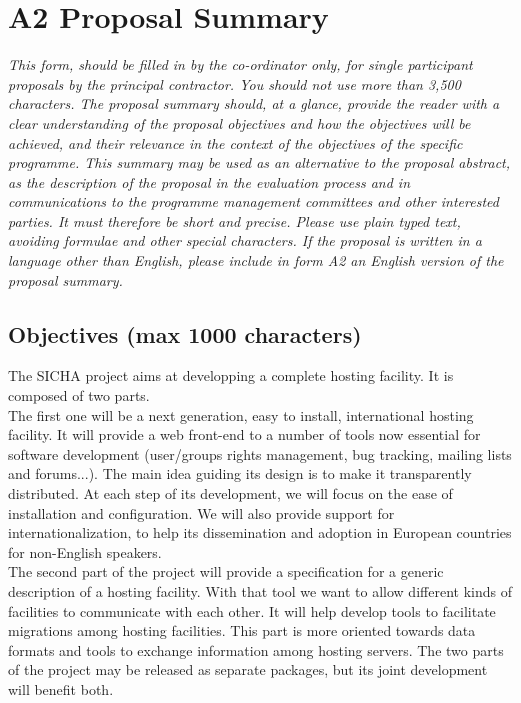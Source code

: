 \documentclass[a4paper,11pt]{report}
\begin{document}
\section*{A2 Proposal Summary}
\textit{This form, should be filled in by the co-ordinator only, for single
participant proposals by the principal contractor. You should not use more than
3,500 characters. The proposal summary should, at a glance, provide the reader
with a clear understanding of the proposal objectives and how the objectives
will be achieved, and their relevance in the context of the objectives of the
specific programme. This summary may be used as an alternative to the proposal
abstract, as the description of the proposal in the evaluation process and in
communications to the programme management committees and other interested
parties. It must therefore be short and precise. Please use plain typed text,
avoiding formulae and other special characters. If the proposal is written in a
language other than English, please include in form A2 an English version of
the proposal summary.} \\
\subsection*{Objectives (max 1000 characters)}
The SICHA project aims at developping a complete hosting facility. It is 
composed of two parts. \\
The first one will be a next generation, easy to install, international
hosting facility. It will provide a web front-end to a number of tools now 
essential for software development (user/groups rights management, bug
tracking, mailing lists and forums...). 
The main idea guiding its design is to make it transparently distributed.
At each step of its development, we will focus on the ease of installation and
configuration. We will also provide support for internationalization, to help
its dissemination and adoption in European countries for non-English speakers.
\\
The second part of the project will provide a specification for a generic
description of a hosting facility. With that tool we want to allow different
kinds of facilities to communicate with each other. It will help develop tools
to facilitate migrations among hosting facilities. This part is more oriented
towards data formats and tools to exchange information among hosting
servers. The two parts of the project may be released as separate packages,
but its joint development will benefit both.\\
\\ 
\end{document}
